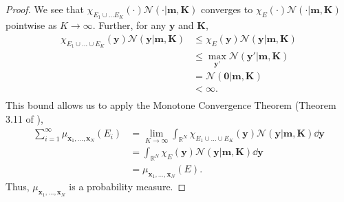 \begin{proof}
    We see that $\chi_{E_1 \cup \dots E_K}(\cdot)\mathcal{N}(\cdot | \mathbf{m}, \mathbf{K})$ converges to $\chi_E(\cdot) \mathcal{N}(\cdot | \mathbf{m}, \mathbf{K})$ pointwise as $K \to \infty$.
    Further, for any $\mathbf{y}$ and $\mathbf{K}$,
    \begin{align*}
        \chi_{E_1 \cup \dots \cup E_K}(\mathbf{y}) \mathcal{N}(\mathbf{y} | \mathbf{m}, \mathbf{K})
        & \leq \chi_E(\mathbf{y}) \mathcal{N}(\mathbf{y} | \mathbf{m}, \mathbf{K}) \\
        & \leq \max_{\mathbf{y}'}\mathcal{N}(\mathbf{y'} | \mathbf{m}, \mathbf{K}) \\
        & = \mathcal{N}( \mathbf{0} | \mathbf{m}, \mathbf{K}) \\
        & < \infty. \\
    \end{align*}
    This bound allows us to apply the Monotone Convergence Theorem (Theorem 3.11 of \cite{axler2020}),
    \begin{align*}
        \sum_{i = 1}^{\infty} \mu_{\mathbf{x}_1, \dots, \mathbf{x}_N}(E_i)
        & = \lim_{K \to \infty}\int_{\mathbb{R}^{N}} \chi_{E_1 \cup \dots \cup E_K}(\mathbf{y})\mathcal{N}(\mathbf{y} | \mathbf{m}, \mathbf{K}) \dd \mathbf{y} \\
        & = \int_{\mathbb{R}^{N}} \chi_{E}(\mathbf{y})\mathcal{N}(\mathbf{y} | \mathbf{m}, \mathbf{K}) \dd \mathbf{y} \\
        & = \mu_{\mathbf{x}_1, \dots, \mathbf{x}_N}(E).
    \end{align*}
    Thus, $\mu_{\mathbf{x}_1, \dots, \mathbf{x}_N}$ is a probability measure.


\end{proof}
